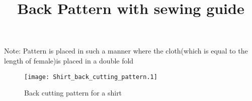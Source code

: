 \documentclass[a4paper]{article}
\begin{document}
\title {Back Pattern with sewing guide}
\maketitle

Note: Pattern is placed in such a manner where the cloth(which is equal to the length of female)is placed in a double fold

\begin{figure}[!ht]

\texttt{[image: Shirt\_back\_cutting\_pattern.1]}
\caption{Back cutting pattern for a shirt}

\end{figure}
\end{document}
